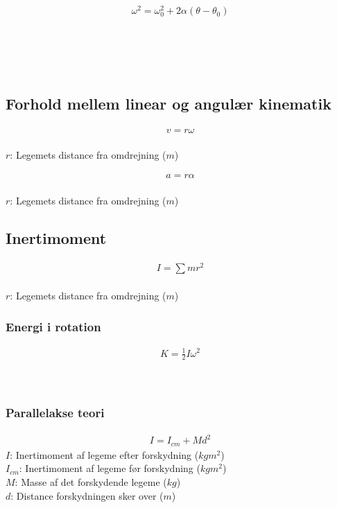 	\begin{align}
		\omega^2=\omega_0^2+2\alpha(\theta-\theta_0)
	\end{align}
	\vinkelhast\\
	\vinkelhastbeg\\
	\vinkelacceleration\\
	\vinkel\\
	\vinkelbeg

\subsection{Forhold mellem linear og angulær kinematik}
	\begin{align}
		v=r\omega
	\end{align}
	\vel\\
	$r$: Legemets distance fra omdrejning ($m$)\\
	\vinkelhast

	\begin{align}
		a=r\alpha
	\end{align}
	\acc\\
	$r$: Legemets distance fra omdrejning ($m$)\\
	\vinkelacceleration

\subsection{Inertimoment}
	\begin{align}
		I=\sum mr^2
	\end{align}
	\inertimom\\
	\masse
	$r$: Legemets distance fra omdrejning ($m$)

	\subsubsection{Energi i rotation}
		\begin{align}
			K=\frac{1}{2}I\omega^2
		\end{align}
		\kinenergi\\
		\inertimom\\
		\vinkelhast

	\subsubsection{Parallelakse teori}
		\begin{align}
			I=I_{cm}+Md^2
		\end{align}
		$I$: Inertimoment af legeme efter forskydning ($kg m^2$)\\
		$I_{cm}$: Inertimoment af legeme før forskydning ($kg m^2$)\\
		$M$: Masse af det forskydende legeme ($kg$)\\
		$d$: Distance forskydningen sker over ($m$)